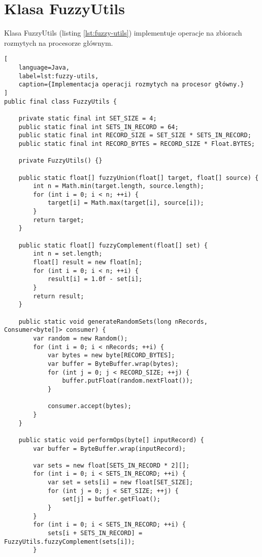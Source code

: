 \section*{Klasa FuzzyUtils}

Klasa FuzzyUtils (listing \ref{lst:fuzzy-utils}) implementuje operacje na zbiorach rozmytych na procesorze głównym.

\begin{lstlisting}[
    language=Java,
    label=lst:fuzzy-utils,
    caption={Implementacja operacji rozmytych na procesor główny.}
]
public final class FuzzyUtils {

    private static final int SET_SIZE = 4;
    public static final int SETS_IN_RECORD = 64;
    public static final int RECORD_SIZE = SET_SIZE * SETS_IN_RECORD;
    public static final int RECORD_BYTES = RECORD_SIZE * Float.BYTES;

    private FuzzyUtils() {}

    public static float[] fuzzyUnion(float[] target, float[] source) {
        int n = Math.min(target.length, source.length);
        for (int i = 0; i < n; ++i) {
            target[i] = Math.max(target[i], source[i]);
        }
        return target;
    }

    public static float[] fuzzyComplement(float[] set) {
        int n = set.length;
        float[] result = new float[n];
        for (int i = 0; i < n; ++i) {
            result[i] = 1.0f - set[i];
        }
        return result;
    }

    public static void generateRandomSets(long nRecords, Consumer<byte[]> consumer) {
        var random = new Random();
        for (int i = 0; i < nRecords; ++i) {
            var bytes = new byte[RECORD_BYTES];
            var buffer = ByteBuffer.wrap(bytes);
            for (int j = 0; j < RECORD_SIZE; ++j) {
                buffer.putFloat(random.nextFloat());
            }

            consumer.accept(bytes);
        }
    }

    public static void performOps(byte[] inputRecord) {
        var buffer = ByteBuffer.wrap(inputRecord);

        var sets = new float[SETS_IN_RECORD * 2][];
        for (int i = 0; i < SETS_IN_RECORD; ++i) {
            var set = sets[i] = new float[SET_SIZE];
            for (int j = 0; j < SET_SIZE; ++j) {
                set[j] = buffer.getFloat();
            }
        }
        for (int i = 0; i < SETS_IN_RECORD; ++i) {
            sets[i + SETS_IN_RECORD] = FuzzyUtils.fuzzyComplement(sets[i]);
        }


\end{lstlisting}
